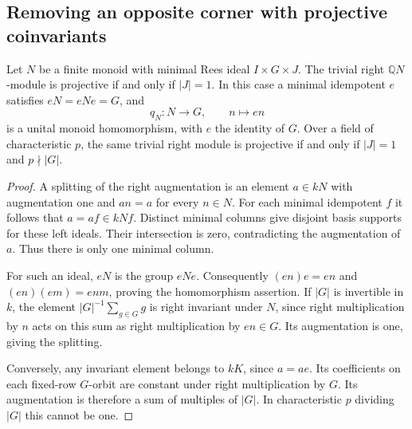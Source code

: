 \subsection{Removing an opposite corner with projective coinvariants}

\begin{lemma}
\label{C:projective-coinvariants-minimal-column}
Let $N$ be a finite monoid with minimal Rees ideal $I\times G\times J$.
The trivial right $\mathbb QN$-module is projective if and only if
$|J|=1$. In this case a minimal idempotent $e$ satisfies
$eN=eNe=G$, and
\[
 q_N:N\longrightarrow G,\qquad n\longmapsto en
\]
is a unital monoid homomorphism, with $e$ the identity of $G$.
Over a field of characteristic $p$, the same trivial right module
is projective if and only if $|J|=1$ and $p\nmid|G|$.
\end{lemma}
\begin{proof}
A splitting of the right augmentation is an element $a\in kN$
with augmentation one and $an=a$ for every $n\in N$.
For each minimal idempotent $f$ it follows that $a=af\in kNf$.
Distinct minimal columns give disjoint basis supports for these
left ideals. Their intersection is zero, contradicting the
augmentation of $a$. Thus there is only one minimal column.

For such an ideal, $eN$ is the group $eNe$.
Consequently $(en)e=en$ and
$(en)(em)=enm$, proving the homomorphism assertion.
If $|G|$ is invertible in $k$, the element
$|G|^{-1}\sum_{g\in G}g$ is right invariant under $N$, since
right multiplication by $n$ acts on this sum as right multiplication
by $en\in G$. Its augmentation is one, giving the splitting.

Conversely, any invariant element belongs to $kK$, since $a=ae$.
Its coefficients on each fixed-row $G$-orbit are constant under
right multiplication by $G$. Its augmentation is therefore a
sum of multiples of $|G|$. In characteristic $p$ dividing $|G|$
this cannot be one.
\end{proof}

